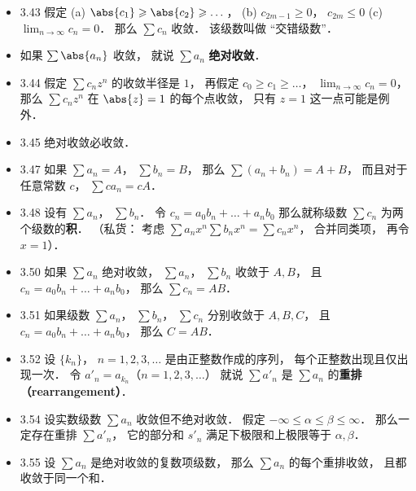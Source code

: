 \begin{itemize}
\item 3.43 假定 (a) $\abs{c_1}\geqslant \abs{c_2}\geqslant \dots$， (b) $c_{2m-1}\geqslant 0$， $c_{2m}\leqslant 0$ (c) $\lim_{n\to\infty} c_n=0$． 那么 $\sum c_n$ 收敛． 该级数叫做 “交错级数”．

\item 如果 $\sum \abs{a_n}$ 收敛， 就说 $\sum a_n$ \textbf{绝对收敛}．

\item 3.44 假定 $\sum c_n z^n$ 的收敛半径是 $1$， 再假定 $c_0\geqslant c_1\geqslant \dots$， $\lim_{n\to \infty}c_n=0$， 那么 $\sum c_nz^n$ 在 $\abs{z}=1$ 的每个点收敛， 只有 $z=1$ 这一点可能是例外．

\item 3.45 绝对收敛必收敛．

\item 3.47 如果 $\sum a_n=A$， $\sum b_n=B$， 那么 $\sum (a_n+b_n)=A+B$， 而且对于任意常数 $c$， $\sum ca_n=cA$．

\item 3.48 设有 $\sum a_n$， $\sum b_n$． 令 $c_n=a_0b_n+\dots+a_nb_0$ 那么就称级数 $\sum c_n$ 为两个级数的\textbf{积}． （私货： 考虑 $\sum a_n x^n \sum b_n x^n = \sum c_n x^n$， 合并同类项， 再令 $x=1$）．

\item 3.50 如果 $\sum a_n$ 绝对收敛， $\sum a_n$， $\sum b_n$ 收敛于 $A,B$， 且 $c_n=a_0b_n+\dots+a_nb_0$， 那么 $\sum c_n = AB$．

\item 3.51 如果级数 $\sum a_n$， $\sum b_n$， $\sum c_n$ 分别收敛于 $A,B,C$， 且 $c_n=a_0b_n+\dots+a_nb_0$， 那么 $C=AB$．

\item 3.52 设 $\{k_n\}$， $n=1,2,3,\dots$ 是由正整数作成的序列， 每个正整数出现且仅出现一次． 令 $a'_n=a_{k_n}$（$n=1,2,3,\dots$） 就说 $\sum a'_n$ 是 $\sum a_n$ 的\textbf{重排（rearrangement）}．

\item 3.54 设实数级数 $\sum a_n$ 收敛但不绝对收敛． 假定 $-\infty\leqslant \alpha\leqslant\beta\leqslant\infty$． 那么一定存在重排 $\sum a'_n$， 它的部分和 $s'_n$ 满足下极限和上极限等于 $\alpha, \beta$．

\item 3.55 设 $\sum a_n$ 是绝对收敛的复数项级数， 那么 $\sum a_n$ 的每个重排收敛， 且都收敛于同一个和．
\end{itemize}
